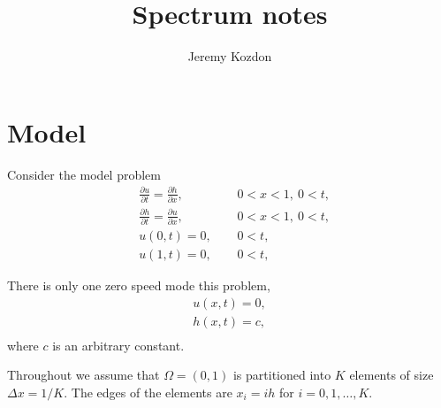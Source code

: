 \documentclass[american]{article}
\author{Jeremy Kozdon}
\title{Spectrum notes}
\newcommand{\pder} [2]{\frac{\partial#1}{\partial#2}}
\begin{document}
\maketitle

\section{Model}
Consider the model problem
\begin{subequations}
  \begin{alignat}{2}
    &\pder{u}{t} = \pder{h}{x}, &~~& 0 < x < 1, ~ 0 < t,\\
    &\pder{h}{t} = \pder{u}{x}, &~~& 0 < x < 1, ~ 0 < t,\\
    &u(0, t) = 0, &~~& 0 < t,\\
    &u(1, t) = 0, &~~& 0 < t,
  \end{alignat}
\end{subequations}

There is only one zero speed mode this problem,
\begin{equation}
  \begin{split}
    u(x, t) = 0,\\
    h(x, t) = c,\\
  \end{split}
\end{equation}
where $c$ is an arbitrary constant.

Throughout we assume that $\Omega = (0, 1)$ is partitioned into $K$ elements of
size $\Delta x = 1 / K$. The edges of the elements are $x_{i} = ih$ for $i = 0,
1, \dots, K$.
\end{document}
